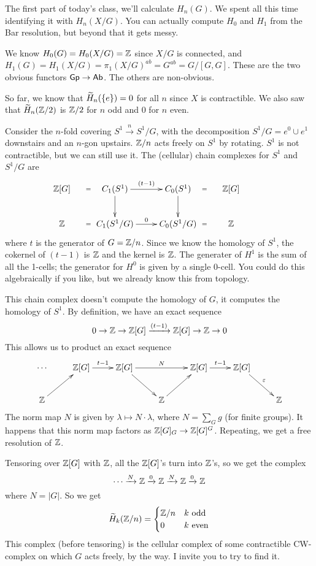 
The first part of today's class, we'll calculate $H_n(G)$. We spent all this time identifying it with $H_n(X/G)$. You can actually compute $H_0$ and $H_1$ from the Bar resolution, but beyond that it gets messy.

We know $H_0(G)=H_0(X/G)=\mathbb{Z}$ since $X/G$ is connected, and $H_1(G)=H_1(X/G)=\pi_1(X/G)^\mathit{ab}=G^\mathit{ab}=G/[G,G]$. These are the two obvious functors $\text{\sf Gp}\to \text{\sf Ab}$. The others are non-obvious.

So far, we know that $\widetilde{H}_n(\{e\})=0$ for all $n$ since $X$ is contractible. We also saw that $\widetilde{H}_n(\mathbb{Z}/2)$ is $\mathbb{Z}/2$ for $n$ odd and $0$ for $n$ even.

\begin{example}[$G=\ZZ/n$]
 Consider the $n$-fold covering $S^1\xrightarrow n S^1/G$, with the decomposition $S^1/G=e^0\cup e^1$ downstairs and an $n$-gon upstairs. $\mathbb{Z}/n$ acts freely on $S^1$ by rotating. $S^1$ is not contractible, but we can still use it. The (cellular) chain complexes for $S^1$ and $S^1/G$ are 
 \[\xymatrix{
  \ZZ[G]\ar@{}[r]|=& C_1(S^1)\ar[r]^{(t-1)}\ar[d] & C_0(S^1)\ar[d]& \ZZ[G]\ar@{}[l]|=\\
  \ZZ\ar@{}[r]|=& C_1(S^1/G)\ar[r]^0 & C_0(S^1/G) & \ZZ\ar@{}[l]|=&\\
 }\]
 where $t$ is the generator of $G=\ZZ/n$. Since we know the homology of $S^1$, the cokernel of $(t-1)$ is $\mathbb{Z}$ and the kernel is $\mathbb{Z}$. The generater of $H^1$ is the sum of all the 1-cells; the generator for $H^0$ is given by a single 0-cell. You could do this algebraically if you like, but we already know this from topology.
 
 This chain complex doesn't compute the homology of $G$, it computes the homology of $S^1$. By definition, we have an exact sequence
 \[
  0\to \mathbb{Z}\to \mathbb{Z}[G]\xrightarrow{(t-1)} \mathbb{Z}[G]\to \mathbb{Z}\to 0
 \]
 This allows us to product an exact sequence
 \[\xymatrix{
  \cdots & \ZZ[G] \ar[r]^{t-1} & \ZZ[G] \ar[rr]^N & & \ZZ[G] \ar[r]^{t-1} & \ZZ[G]\ar[dr]^\e \\
  \ZZ\ar[ur] & & & \ZZ \ar[ur] \ar@{<-}[ul] & & & \ZZ
 }\]
 The norm map $N$ is given by $\lambda\mapsto N\cdot \lambda$, where $N=\sum_G g$ (for finite groups). It happens that this norm map factors as $\mathbb{Z}[G]_G\to \mathbb{Z}[G]^G$. Repeating, we get a free resolution of $\mathbb{Z}$.
 
 Tensoring over $\mathbb{Z}[G]$ with $\mathbb{Z}$, all the $\mathbb{Z}[G]$'s turn into $\mathbb{Z}$'s, so we get the complex
 \[
  \cdots \xrightarrow N \mathbb{Z}\xrightarrow 0 \mathbb{Z}\xrightarrow N \mathbb{Z}\xrightarrow 0 \mathbb{Z}
 \]
 where $N=|G|$. So we get
 \[
  \widetilde{H}_k(\mathbb{Z}/n) =
  \begin{cases}
   \mathbb{Z}/n & k \text{ odd}\\
   0 & k \text{ even}
  \end{cases}
 \]
 This complex (before tensoring) is the cellular complex of some contractible CW-complex on which $G$ acts freely, by the way. I invite you to try to find it.
\end{example}

